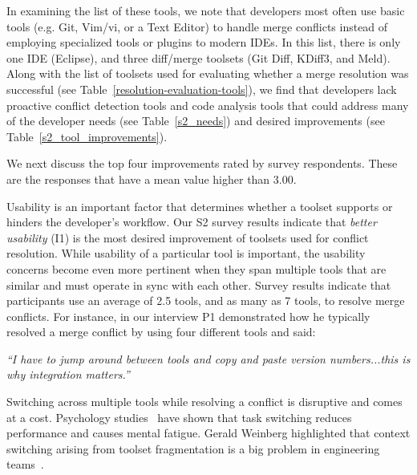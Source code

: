 In examining the list of these tools, we note that developers most often use basic tools (e.g. Git, Vim/vi, or a Text Editor) to handle merge conflicts instead of employing specialized tools or plugins to modern IDEs. 
In this list, there is only one IDE (Eclipse), and three diff/merge toolsets (Git Diff, KDiff3, and Meld). 
Along with the list of toolsets used for evaluating whether a merge resolution was successful (see Table~\ref{resolution-evaluation-tools}), we find that developers lack proactive conflict detection tools and code analysis tools that could address many of the developer needs (see Table~\ref{s2_needs}) and desired improvements (see Table~\ref{s2_tool_improvements}).

We next discuss the top four improvements rated by survey respondents. These are the responses that have a mean value higher than $3.00$.

Usability is an important factor that determines whether a toolset supports or hinders the developer's workflow.
Our S2 survey results indicate that \textit{better usability} (I1) is the most desired improvement of toolsets used for conflict resolution. 
While usability of a particular tool is important, the usability concerns become even more pertinent when they span multiple tools that are similar and must operate in sync with each other.
Survey results indicate that participants use an average of 2.5 tools, and as many as 7 tools, to resolve merge conflicts.
For instance, in our interview P1 demonstrated how he typically resolved a merge conflict by using four different tools and said: 
\begin{quoting}
\textit{``I have to jump around between tools and copy and paste version numbers...this is why integration matters.''}
\end{quoting}

Switching across multiple tools while resolving a conflict is disruptive and comes at a cost. 
Psychology studies~\cite{Meiran2000}\cite{gopher2000switching} have shown that task switching reduces performance and causes mental fatigue. 
Gerald Weinberg highlighted that context switching arising from toolset fragmentation is a big problem in engineering teams~\cite{Weinberg1992}. 


